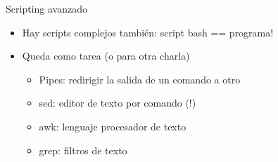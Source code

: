 \begin{frame}{Scripting avanzado}
\begin{itemize}
	\item Hay scripts complejos tambi\'en: script bash == programa!
	\item Queda como tarea (o para otra charla) \\
		\begin{itemize}
			\item Pipes: redirigir la salida de un comando a otro
			\item sed: editor de texto por comando (!)
			\item awk: lenguaje procesador de texto
			\item grep: filtros de texto
		\end{itemize}
\end{itemize}

\begin{center}
\end{center}
\end{frame}


